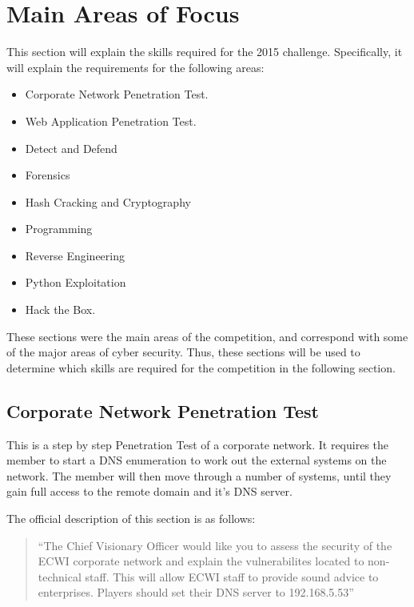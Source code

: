 \documentclass[a4paper,11pt]{report}
\begin{document}
	\section{Main Areas of Focus}
		This section will explain the skills required for the 2015 challenge. 
		Specifically, it will explain the requirements for the following areas:
		\begin{itemize}
			\item Corporate Network Penetration Test.
			\item Web Application Penetration Test. 
			\item Detect and Defend
			\item Forensics
			\item Hash Cracking and Cryptography
			\item Programming
			\item Reverse Engineering
			\item Python Exploitation
			\item Hack the Box. 
		\end{itemize}
		These sections were the main areas of the competition, and correspond with some of the major areas of cyber security. 
		Thus, these sections will be used to determine which skills are required for the competition in the following section. 
		\subsection{Corporate Network Penetration Test}
			This is a step by step Penetration Test of a corporate network. 
			It requires the member to start a DNS enumeration to work out the external systems on the network. 
			The member will then move through a number of systems, 
			until they gain full access to the remote domain and it's DNS server. 

			The official description of this section is as follows:
			\begin{quote}
				``The Chief Visionary Officer would like you to assess the security of the ECWI corporate network and explain the vulnerabilites located to non-technical staff. This will allow ECWI staff to provide sound advice to enterprises. Players should set their DNS server to 192.168.5.53''
			\end{quote}
\end{document}
